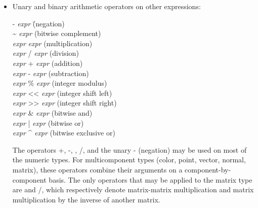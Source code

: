 \documentclass[11pt,letterpaper]{book}
\def\color{{\cf color}\xspace}
\def\matrix{{\cf matrix}\xspace}
\def\normal{{\cf normal}\xspace}
\def\point{{\cf point}\xspace}
\def\vector{{\cf vector}\xspace}
\begin{document}
\begin{itemize}
\item Unary and binary arithmetic operators on other expressions:

\begin{tabbing}
\hspace{0.25in} {\cf -} \emph{expr} \hspace{1in} \= (negation) \\
\hspace{0.25in} {\cf \textasciitilde} \emph{expr} \> (bitwise complement) \\
\hspace{0.25in} \emph{expr} {\cf *} \emph{expr} \> (multiplication) \\
\hspace{0.25in} \emph{expr} {\cf /} \emph{expr} \> (division) \\
\hspace{0.25in} \emph{expr} {\cf +} \emph{expr} \> (addition) \\
\hspace{0.25in} \emph{expr} {\cf -} \emph{expr} \> (subtraction) \\
\hspace{0.25in} \emph{expr} {\cf \%} \emph{expr} \> (integer modulus) \\
\hspace{0.25in} \emph{expr} {\cf <<} \emph{expr} \> (integer shift left) \\
\hspace{0.25in} \emph{expr} {\cf >>} \emph{expr} \> (integer shift right) \\
\hspace{0.25in} \emph{expr} {\cf \&} \emph{expr} \> (bitwise and) \\
\hspace{0.25in} \emph{expr} {\cf |} \emph{expr} \> (bitwise or) \\
\hspace{0.25in} \emph{expr} {\cf \textasciicircum} \emph{expr} \> (bitwise exclusive or) \\
\end{tabbing}

The operators {\cf +}, {\cf -}, {\cf *}, {\cf /}, and the unary {\cf -}
(negation) may be used on most of the numeric types.  For multicomponent
types (\color, \point, \vector, \normal, \matrix), these operators
combine their arguments on a component-by-component basis.
The only operators that may be applied to the \matrix type are
{\cf *} and {\cf /}, which respectively denote matrix-matrix
multiplication and matrix multiplication by the inverse of another
matrix.


\end{itemize}
\end{document}
